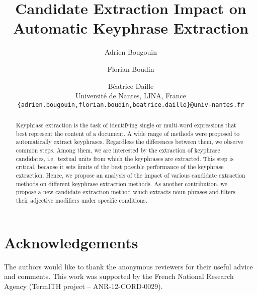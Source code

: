 \documentclass[11pt]{article}
\title{Candidate Extraction Impact on Automatic Keyphrase Extraction}
\author{
  Adrien Bougouin \and Florian Boudin \and Béatrice Daille\\
  Université de Nantes, LINA, France\\
  {\tt \{adrien.bougouin,florian.boudin,beatrice.daille\}@univ-nantes.fr}
}
\date{}
\begin{document}
  \maketitle
  \begin{abstract}
    Keyphrase extraction is the task of identifying single or multi-word
    expressions that best represent the content of a document. A wide range of
    methods were proposed to automatically extract keyphrases. Regardless the
    differences between them, we observe common steps. Among them, we are
    interested by the extraction of keyphrase candidates, i.e.~textual units
    from which the keyphrases are extracted. This step is critical, because it
    sets limits of the best possible performance of the keyphrase extraction.
    Hence, we propose an analysis of the impact of various candidate extraction
    methods on different keyphrase extraction methods. As another contribution,
    we propose a new candidate extraction method which extracts noun phrases and
    filters their adjective modifiers under specific conditions.
  \end{abstract}

  

  \section*{Acknowledgements}
  The authors would like to thank the anonymous reviewers for their useful
  advice and comments. This work was supported by the French National Research
  Agency (TermITH project -- ANR-12-CORD-0029).

  
  
\end{document}
